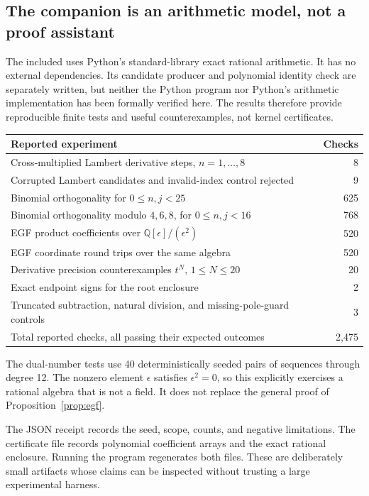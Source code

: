 \documentclass[11pt,a4paper]{article}
\newcommand{\code}[1]{\texttt{\detokenize{#1}}}
\newcommand{\Q}{\mathbb Q}
\theoremstyle{definition}
\theoremstyle{remark}
\begin{document}
\subsection{The companion is an arithmetic model, not a proof assistant}
The included \code{experiments/exact_experiments.py} uses Python's standard-library exact rational arithmetic. It has no external dependencies. Its candidate producer and polynomial identity check are separately written, but neither the Python program nor Python's arithmetic implementation has been formally verified here. The results therefore provide reproducible finite tests and useful counterexamples, not kernel certificates.

\begin{center}\small
\begin{tabularx}{\textwidth}{@{}Y r@{}}
\toprule
Reported experiment & Checks\\
\midrule
Cross-multiplied Lambert derivative steps, $n=1,\ldots,8$ & 8\\
Corrupted Lambert candidates and invalid-index control rejected & 9\\
Binomial orthogonality for $0\le n,j<25$ & 625\\
Binomial orthogonality modulo $4,6,8$, for $0\le n,j<16$ & 768\\
EGF product coefficients over $\Q[\epsilon]/(\epsilon^2)$ & 520\\
EGF coordinate round trips over the same algebra & 520\\
Derivative precision counterexamples $t^N$, $1\le N\le20$ & 20\\
Exact endpoint signs for the root enclosure & 2\\
Truncated subtraction, natural division, and missing-pole-guard controls & 3\\
\midrule
Total reported checks, all passing their expected outcomes & 2,475\\
\bottomrule
\end{tabularx}
\end{center}
The dual-number tests use 40 deterministically seeded pairs of sequences through degree 12. The nonzero element $\epsilon$ satisfies $\epsilon^2=0$, so this explicitly exercises a rational algebra that is not a field. It does not replace the general proof of Proposition~\ref{prop:egf}.

The JSON receipt records the seed, scope, counts, and negative limitations. The certificate file records polynomial coefficient arrays and the exact rational enclosure. Running the program regenerates both files. These are deliberately small artifacts whose claims can be inspected without trusting a large experimental harness.
\end{document}
